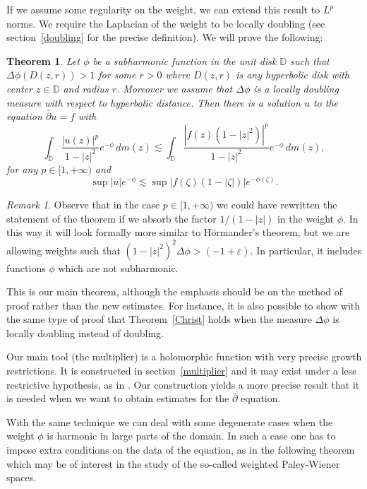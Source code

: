 \documentclass[12pt,twoside,final,psamsfonts]{amsart}
\theoremstyle{plain}
\newtheorem{teor}{Theorem}
\theoremstyle{remark}
\newtheorem*{remark}{Remark}
\theoremstyle{definition}
\newcommand{\D}{{\mathbb D}}
\newcommand{\dbar}{\bar\partial}
\begin{document}
If we assume some regularity on the weight, we can extend this result
to $L^p$ norms. We require the Laplacian of the weight to be locally
doubling (see section~\ref{doubling} for the precise definition).
We will prove the following: 

\begin{teor}\label{meu}
Let $\phi$ be a subharmonic function in the unit disk $\D$ such that 
$\Delta\phi (D(z,r))> 1$ for some $r>0$ where $D(z,r)$ is
any hyperbolic disk with center $z\in \D$ and radius $r$. Moreover we assume
that $\Delta\phi$ is a locally
doubling measure with respect to hyperbolic
distance. Then there is  a solution $u$ to the equation $\dbar u=f$ with
\[
\int_{\D} \frac {|u(z)|^p}{1-|z|^2}e^{-\phi}\, dm(z)
\lesssim
\int_{\D}  \frac{|f(z)(1-|z|^2)|^p}{1-|z|^2} e^{-\phi}\, dm(z),
\]
for any $p\in[1,+\infty)$ and 
\[
\sup |u| e^{-\phi} \lesssim \sup |f(\zeta)(1-|\zeta|)|e^{-\phi(\zeta)}.
\]
\end{teor}

\begin{remark} Observe that in the case $p\in[1,+\infty)$ we could have
rewritten the statement of the theorem if we absorb the factor $1/(1-|z|)$ in
the weight $\phi$. In this way it will look formally more similar to
H\"ormander's theorem, but we are allowing weights such that 
$(1-|z|^2)^2\Delta\phi>(-1+\varepsilon)$. 
In particular, it includes functions $\phi$
which are not subharmonic.
\end{remark}

This is our main theorem, although the emphasis should be on the method of
proof rather than the new estimates. 
For instance, it is also possible to show
with the same type of proof that Theorem~\ref{Christ} holds when the measure
$\Delta \phi$ is locally doubling instead of doubling.

Our main tool (the multiplier) is a holomorphic function with very precise
growth restrictions. It is constructed in section~\ref{multiplier} and it may
exist under a less restrictive hypothesis, as in \cite{LyuMal99}. Our 
construction yields a more precise result that it is
needed when we
want to obtain estimates for the $\dbar$ equation.

With the same technique we can deal with some degenerate cases when
the weight $\phi$ is harmonic in large parts of the domain. In such a case one
has to impose extra conditions on the data of the equation, as in the following
theorem which may be of interest in the study of the so-called weighted
Paley-Wiener spaces.
\end{document}
